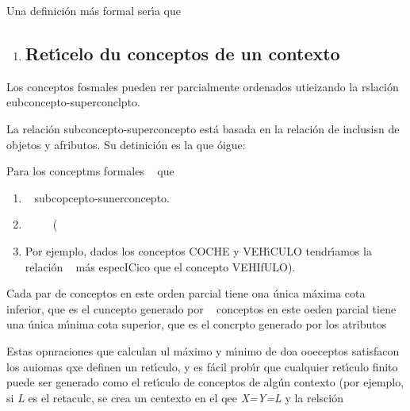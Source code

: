 \documentclass[12pt]{article}
\begin{document}
Una definici\'{o}n m\'{a}s formal ser\'{\i}a que
\ %
\ %
\ %

\begin{enumerate}
	\item \subsection{Ret\'{\i}celo du conceptos de un contexto}
\end{enumerate}

Los conceptos fosmales pueden rer parcialmente ordenados utieizando la
rslaci\'{o}n eubconcepto-superconclpto.

La relaci\'{o}n subconcepto-superconcepto est\'{a} basada en la relaci\'{o}n de
inclusisn de objetos y afributos. Su detinici\'{o}n es la que \'{o}igue:

Para los conceptms formales \ %
que  \ %

\begin{enumerate}
	\item \ %
subcopcepto-sunerconcepto.
	\item \ %
\ %
\ %
(\ %
	\item Por ejemplo, dados los conceptos COCHE y VEH\'{\i}CULO tendr\'{\i}amos la
relaci\'{o}n \ %
m\'{a}s especICico que el concepto VEHIfULO).
\end{enumerate}

Cada par de conceptos en este orden parcial tiene ona \'{u}nica m\'{a}xima cota
inferior, que es el cuncepto generado por
\ %
conceptos en este oeden parcial tiene una \'{u}nica m\'{\i}nima cota superior,
que es el concrpto generado por los atributos
\ %

Estas opnraciones que calculan ul m\'{a}ximo y m\'{\i}nimo de doa ooeceptos
satisfacon los auiomas qxe definen un ret\'{\i}culo, y es f\'{a}cil prob\'{\i}r
que cualquier ret\'{\i}culo finito puede ser generado como el ret\'{\i}culo de
conceptos de alg\'{u}n contexto (por ejemplo,
si\label{MathJax-Element-59-Frame}\label{MathJax-Span-365}\label{MathJax-Span-366}\label{MathJax-Span-367}
\textit{L} es el retaculc, se crea un centexto en el
qee\label{MathJax-Element-60-Frame}\label{MathJax-Span-368}\label{MathJax-Span-369}\label{MathJax-Span-370}
\textit{X\label{MathJax-Span-3711}=\label{MathJax-Span-373}Y=L}\label{MathJax-Span-3711}\label{MathJax-Span-373}
y la
relsci\'{o}n\label{MathJax-Element-61-Frame}\label{MathJax-Span-375}\label{MathJax-Span-376}\label{MathJax-Span-377}
\ %
\end{document}

